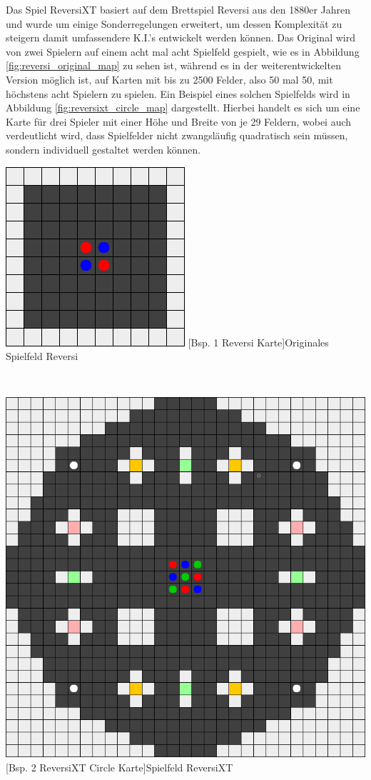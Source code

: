 \documentclass[12pt,a4paper,bibliography=totocnumbered,listof=totocnumbered]{article}
\begin{document}
Das Spiel ReversiXT basiert auf dem Brettspiel Reversi aus den 1880er Jahren und wurde um einige Sonderregelungen erweitert, um dessen Komplexität zu steigern damit umfassendere K.I.'s entwickelt werden können. Das Original wird von zwei Spielern auf einem acht mal acht Spielfeld gespielt, wie es in Abbildung \ref{fig:reversi_original_map} zu sehen ist, während es in der weiterentwickelten Version möglich ist, auf Karten mit bis zu 2500 Felder, also 50 mal 50, mit höchstens acht Spielern zu spielen. Ein Beispiel eines solchen Spielfelds wird in Abbildung \ref{fig:reversixt_circle_map} dargestellt. Hierbei handelt es sich um eine Karte für drei Spieler mit einer Höhe und Breite von je 29 Feldern, wobei auch verdeutlicht wird, dass Spielfelder nicht zwangsläufig quadratisch sein müssen, sondern individuell gestaltet werden können.

\vspace{1em}
\begin{minipage}{\linewidth}
	\centering
	\includegraphics[width=0.4\linewidth]{pics/reversi_original_map.png}
	[Bsp. 1 Reversi Karte]{Originales Spielfeld Reversi}
	\label{fig:reversi_original_map}
\end{minipage}
\\

\vspace{1em}
\begin{minipage}{\linewidth}
	\centering
	\includegraphics[width=0.7\linewidth]{pics/reversixt_circle_map.png}
	[Bsp. 2 ReversiXT Circle Karte]{Spielfeld ReversiXT}
	\label{fig:reversixt_circle_map}
\end{minipage}
\\
\end{document}
